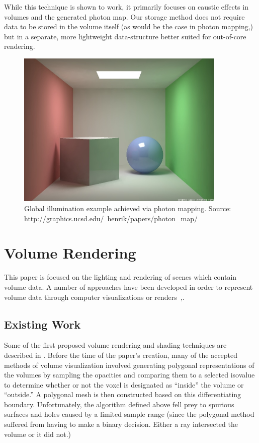 \documentclass[12pt]{ucthesis}
\begin{document}
While this technique is shown to work, it primarily focuses on caustic effects in volumes and the generated photon map.  Our storage method does not require data to be stored in the volume itself (as would be the case in photon mapping,) but in a separate, more lightweight data-structure better suited for out-of-core rendering.

\begin{figure}[h!]
    \centering
    \includegraphics[width=100mm]{img/external/ewr7_mcbox.jpg}
    \caption{Global illumination example achieved via photon mapping.  Source: http://graphics.ucsd.edu/\string~henrik/papers/photon\_map/}
    \label{fig:photon}
\end{figure}

\section{Volume Rendering}
This paper is focused on the lighting and rendering of scenes which contain volume data.  A number of approaches have been developed in order to represent volume data through computer visualizations or renders~\cite{Kajiya84},\cite{levoy88}.

\subsection{Existing Work}
Some of the first proposed volume rendering and shading techniques are described in \cite{levoy88}.  Before the time of the paper's creation, many of the accepted methods of volume visualization involved generating polygonal representations of the volumes by sampling the opacities and comparing them to a selected isovalue to determine whether or not the voxel is designated as ``inside'' the volume or ``outside.''  A polygonal mesh is then constructed based on this differentiating boundary.  Unfortunately, the algorithm defined above fell prey to spurious surfaces and holes caused by a limited sample range (since the polygonal method suffered from having to make a binary decision.  Either a ray intersected the volume or it did not.)
\end{document}
